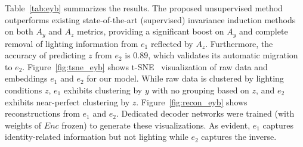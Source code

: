 Table~\ref{tab:eyb} summarizes the results. The proposed unsupervised method outperforms existing state-of-the-art (supervised) invariance induction methods on both $A_y$ and $A_z$ metrics, providing a significant boost on $A_y$ and complete removal of lighting information from $e_1$ reflected by $A_z$. Furthermore, the accuracy of predicting $z$ from $e_2$ is $0.89$, which validates its automatic migration to $e_2$. Figure~\ref{fig:tsne_eyb} shows t-SNE~\cite{bib:tsne} visualization of raw data and embeddings $e_1$ and $e_2$ for our model. While raw data is clustered by lighting conditions $z$, $e_1$ exhibits clustering by $y$ with no grouping based on $z$, and $e_2$ exhibits near-perfect clustering by $z$. Figure~\ref{fig:recon_eyb} shows reconstructions from $e_1$ and $e_2$. Dedicated decoder networks were trained (with weights of $Enc$ frozen) to generate these visualizations. As evident, $e_1$ captures identity-related information but not lighting while $e_2$ captures the inverse.


